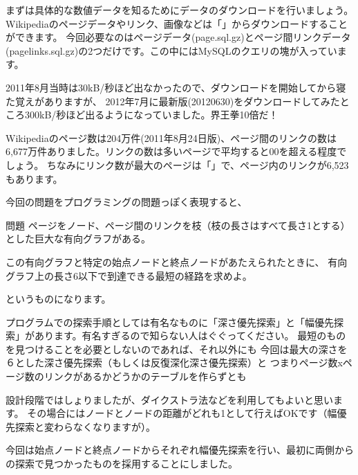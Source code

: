まずは具体的な数値データを知るためにデータのダウンロードを行いましょう。
Wikipediaのページデータやリンク、画像などは「」からダウンロードすることができます。
今回必要なのはページデータ(page.sql.gz)とページ間リンクデータ(pagelinks.sql.gz)の2つだけです。この中にはMySQLのクエリの塊が入っています。

2011年8月当時は30kB/秒ほど出なかったので、ダウンロードを開始してから寝た覚えがありますが、
2012年7月に最新版(20120630)をダウンロードしてみたところ300kB/秒ほど出るようになっていました。界王拳10倍だ！

Wikipediaのページ数は204万件(2011年8月24日版)、ページ間のリンクの数は6,677万件ありました。リンクの数は多いページで平均すると00を超える程度でしょう。
ちなみにリンク数が最大のページは「」で、ページ内のリンクが6,523もあります。

今回の問題をプログラミングの問題っぽく表現すると、
\begin{itembox}{問題}
ページをノード、ページ間のリンクを枝（枝の長さはすべて長さ1とする）とした巨大な有向グラフがある。

この有向グラフと特定の始点ノードと終点ノードがあたえられたときに、
有向グラフ上の長さ6以下で到達できる最短の経路を求めよ。
\end{itembox}
というものになります。

プログラムでの探索手順としては有名なものに「深さ優先探索」と「幅優先探索」があります。有名すぎるので知らない人はぐぐってください。
最短のものを見つけることを必要としないのであれば、それ以外にも
今回は最大の深さを６とした深さ優先探索（もしくは反復深化深さ優先探索）と
つまりページ数xページ数のリンクがあるかどうかのテーブルを作らずとも

設計段階ではしょりましたが、ダイクストラ法などを利用してもよいと思います。
その場合にはノードとノードの距離がどれも1として行えばOKです（幅優先探索と変わらなくなりますが）。

今回は始点ノードと終点ノードからそれぞれ幅優先探索を行い、最初に両側からの探索で見つかったものを採用することにしました。

